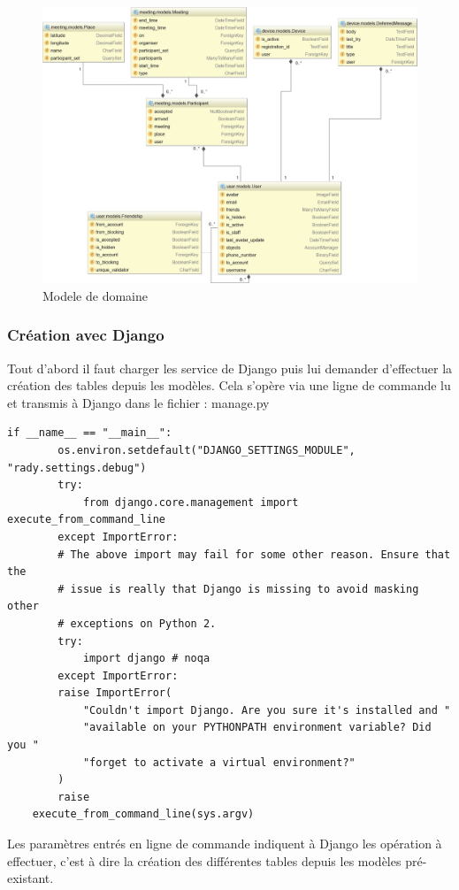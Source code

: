 \documentclass[french]{article}
\begin{document}
	\begin{figure}[H]
		\centering
		\includegraphics[scale=0.45]{../schema/modele-domaine.png}
		\caption{Modele de domaine}
		\label{Modele de domaine}
	\end{figure}
	
	\subsubsection{Création avec Django}	
	
	Tout d'abord il faut charger les service de Django puis lui demander d'effectuer la création des tables depuis les modèles. Cela s'opère via une ligne de commande lu et transmis à Django dans le fichier : manage.py
	
	\begin{lstlisting}[style=py]
	if __name__ == "__main__":
		os.environ.setdefault("DJANGO_SETTINGS_MODULE", "rady.settings.debug")
		try:
			from django.core.management import execute_from_command_line
		except ImportError:
		# The above import may fail for some other reason. Ensure that the
		# issue is really that Django is missing to avoid masking other
		# exceptions on Python 2.
		try:
			import django # noqa
		except ImportError:
		raise ImportError(
			"Couldn't import Django. Are you sure it's installed and "
			"available on your PYTHONPATH environment variable? Did you "
			"forget to activate a virtual environment?"
		)
		raise
	execute_from_command_line(sys.argv)	
	\end{lstlisting}
	
	Les paramètres entrés en ligne de commande indiquent à Django les opération à effectuer, c'est à dire la création des différentes tables depuis les modèles pré-existant.
	
\end{document}
